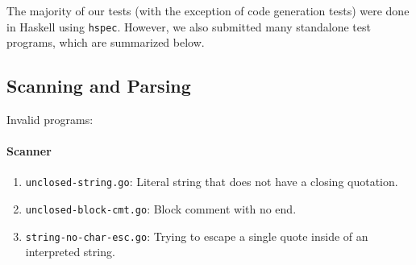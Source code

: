 \documentclass[11pt]{article}
\begin{document}
The majority of our tests (with the exception of code generation tests) were done in
Haskell using \texttt{hspec}. However, we also submitted many standalone test programs,
which are summarized below.

\subsection{Scanning and Parsing}

Invalid programs:
\paragraph{Scanner}
\begin{enumerate}
\item \texttt{unclosed-string.go}: Literal string that does not have a
  closing quotation.
\item \texttt{unclosed-block-cmt.go}: Block comment with no end.
\item \texttt{string-no-char-esc.go}: Trying to escape a single quote
  inside of an interpreted string.
\end{enumerate}
\end{document}
